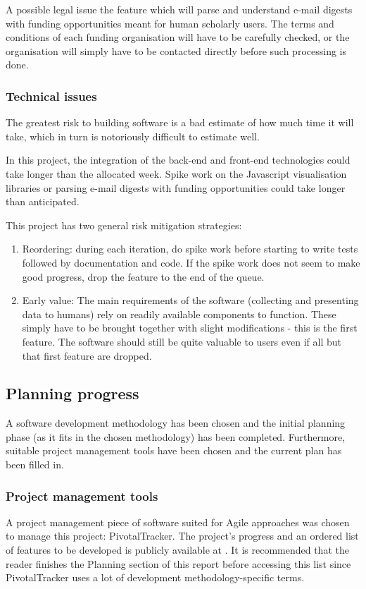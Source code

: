 \documentclass[11pt,fleqn,twoside]{article}
\begin{document}
A possible legal issue the feature which will parse and understand e-mail digests with funding opportunities meant for human scholarly users. The terms and conditions of each funding organisation will have to be carefully checked, or the organisation will simply have to be contacted directly before such processing is done.

\subsubsection{Technical issues}
The greatest risk to building software is a bad estimate of how much time it will take, which in turn is notoriously difficult to estimate well.

In this project, the integration of the back-end and front-end technologies could take longer than the allocated week. Spike work on the Javascript visualisation libraries or parsing e-mail digests with funding opportunities could take longer than anticipated.

This project has two general risk mitigation strategies:
\begin{enumerate}
	\item Reordering: during each iteration, do spike work before starting to write tests followed by documentation and code. If the spike work does not seem to make good progress, drop the feature to the end of the queue.
	\item Early value: The main requirements of the software (collecting and presenting data to humans) rely on readily available components to function. These simply have to be brought together with slight modifications - this is the first feature. The software should still be quite valuable to users even if all but that first feature are dropped.
\end{enumerate}


\subsection{Planning progress}
A software development methodology has been chosen and the initial planning phase (as it fits in the chosen methodology) has been completed. Furthermore, suitable project management tools have been chosen and the current plan has been filled in.

\subsubsection{Project management tools}
\label{pm-tools}
A project management piece of software suited for Agile approaches was chosen to manage this project: PivotalTracker. The project's progress and an ordered list of features to be developed is publicly available at \cite{pm}. It is recommended that the reader finishes the Planning section of this report before accessing this list since PivotalTracker uses a lot of development methodology-specific terms.
\end{document}

